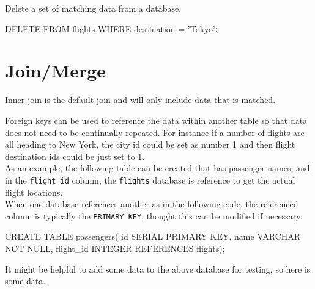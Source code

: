 \documentclass[]{book}
\newenvironment{Shaded}{\begin{snugshade}}{\end{snugshade}}
\newcommand{\KeywordTok}[1]{\textcolor[rgb]{0.13,0.29,0.53}{\textbf{#1}}}
\newcommand{\StringTok}[1]{\textcolor[rgb]{0.31,0.60,0.02}{#1}}
\newcommand{\FunctionTok}[1]{\textcolor[rgb]{0.00,0.00,0.00}{#1}}
\newcommand{\ExtensionTok}[1]{#1}
\newcommand{\NormalTok}[1]{#1}
\begin{document}
Delete a set of matching data from a database.

\begin{Shaded}
\begin{Highlighting}[]
\ExtensionTok{DELETE}\NormalTok{ FROM flights}
\ExtensionTok{WHERE}\NormalTok{ destination = }\StringTok{'Tokyo'}\KeywordTok{;}
\end{Highlighting}
\end{Shaded}

\section{Join/Merge}\label{joinmerge}

Inner join is the default join and will only include data that is
matched.

Foreign keys can be used to reference the data within another table so
that data does not need to be continually repeated. For instance if a
number of flights are all heading to New York, the city id could be set
as number 1 and then flight destination ids could be just set to 1.\\
As an example, the following table can be created that has passenger
names, and in the \texttt{flight\_id} column, the \texttt{flights}
database is reference to get the actual flight locations.\\
When one database references another as in the following code, the
referenced column is typically the \texttt{PRIMARY\ KEY}, thought this
can be modified if necessary.

\begin{Shaded}
\begin{Highlighting}[]
\ExtensionTok{CREATE}\NormalTok{ TABLE passengers(}
    \FunctionTok{id}\NormalTok{ SERIAL PRIMARY KEY,}
    \ExtensionTok{name}\NormalTok{ VARCHAR NOT NULL,}
    \ExtensionTok{flight_id}\NormalTok{ INTEGER REFERENCES flights);}
\end{Highlighting}
\end{Shaded}

It might be helpful to add some data to the above database for testing,
so here is some data.
\end{document}
